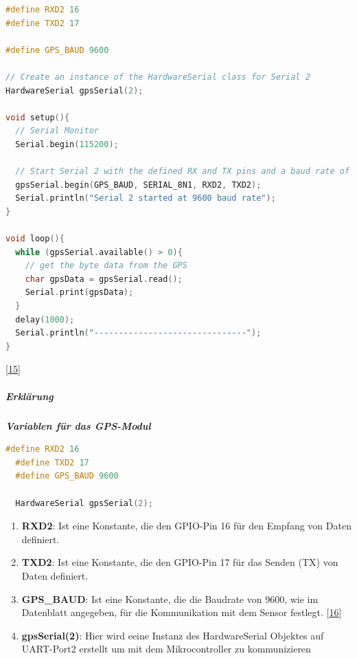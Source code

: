 \documentclass[
    headings=optiontotocandhead,%
    twoside,
    numbers=noenddot,%
    12pt, %
    titlepage, %
    parskip=full, %
    listof=leveldown, 
    numbers=noenddot, %
    a4paper,DIV=14,
    BCOR=15mm,
]{scrbook}
\providecommand{\tightlist}{%
  \setlength{\itemsep}{0pt}\setlength{\parskip}{0pt}}
\begin{document}
\begin{lstlisting}[language={C++}, caption={GY-GPSMV2 Test Programm mit Daten in Rohform}]
#define RXD2 16
#define TXD2 17

#define GPS_BAUD 9600

// Create an instance of the HardwareSerial class for Serial 2
HardwareSerial gpsSerial(2);

void setup(){
  // Serial Monitor
  Serial.begin(115200);
  
  // Start Serial 2 with the defined RX and TX pins and a baud rate of 9600
  gpsSerial.begin(GPS_BAUD, SERIAL_8N1, RXD2, TXD2);
  Serial.println("Serial 2 started at 9600 baud rate");
}

void loop(){
  while (gpsSerial.available() > 0){
    // get the byte data from the GPS
    char gpsData = gpsSerial.read();
    Serial.print(gpsData);
  }
  delay(1000);
  Serial.println("-------------------------------");
}
\end{lstlisting}

{[}\protect\hyperlink{ref-GPS-Testprogramm}{15}{]}

\hypertarget{erkluxe4rung-2}{%
\subparagraph{Erklärung}\label{erkluxe4rung-2}}

\textbf{\emph{Variablen für das GPS-Modul}}

\begin{lstlisting}[language={C++}, caption={GY-GPSMV2 Variablen}]
  #define RXD2 16
  #define TXD2 17
  #define GPS_BAUD 9600

  HardwareSerial gpsSerial(2);
\end{lstlisting}

\begin{enumerate}
\def\labelenumi{\arabic{enumi}.}
\tightlist
\item
  \textbf{RXD2}: Ist eine Konstante, die den GPIO-Pin 16 für den Empfang
  von Daten definiert.\\
\item
  \textbf{TXD2}: Ist eine Konstante, die den GPIO-Pin 17 für das Senden
  (TX) von Daten definiert.\\
\item
  \textbf{GPS\_BAUD}: Ist eine Konstante, die die Baudrate von 9600, wie
  im Datenblatt angegeben, für die Kommunikation mit dem Sensor
  festlegt. {[}\protect\hyperlink{ref-GPS-Baudrate}{16}{]}
\item
  \textbf{gpsSerial(2)}: Hier wird eeine Instanz des HardwareSerial
  Objektes auf UART-Port2 erstellt um mit dem Mikrocontroller zu
  kommunizieren
\end{enumerate}
\end{document}
